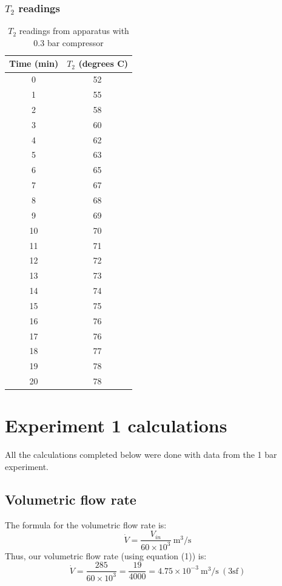 \documentclass[class=article, crop=false, 12pt,a4paper]{standalone}
\begin{document}
\subsubsection{\(T_2\) readings}
\begin{table}
  \centering
    \begin{tabular}{|c|c|}
      \hline
      Time (\si{\minute}) & \(T_2\) (degrees C)\\
      \hline  
      0 & 52\\
      1 & 55\\
      2 & 58\\
      3 & 60\\
      4 & 62\\
      5 & 63\\
      6 & 65\\
      7 & 67\\
      8 & 68\\
      9 & 69\\
      10 & 70\\
      11 & 71\\
      12 & 72\\
      13 & 73\\
      14 & 74\\
      15 & 75\\
      16 & 76\\
      17 & 76\\
      18 & 77\\
      19 & 78\\
      20 & 78\\
      \hline
    \end{tabular}
  \caption{\(T_2\) readings from apparatus with 0.3 bar compressor}
  \label{table:3}
\end{table}
\section{Experiment 1 calculations}
All the calculations completed below were done with data from the 1 bar experiment.
\subsection{Volumetric flow rate}
The formula for the volumetric flow rate is:
\begin{equation}
  \dot{V} = \frac{V_{in}}{60 \times 10^3} \ \si{\meter\cubed\per\second}
  \label{volflowrate}
\end{equation}
Thus, our volumetric flow rate (using equation (1)) is:
\[ \dot{V} = \frac{285}{60\times 10^3} = \frac{19}{4000} = 4.75 \times 10^{-3} \ \si{\meter\cubed\per\second} \ (3\textrm{sf})\]
\end{document}
